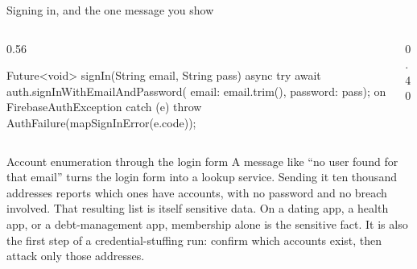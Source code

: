 \documentclass[10pt,aspectratio=169,t]{beamer}
\begin{document}
\begin{frame}[fragile,eyebrow=Firebase Auth]{Signing in, and the one message you show}
  \begin{columns}[T]
    \begin{column}{0.56\textwidth}
\begin{dart}
Future<void> signIn(String email, String pass) async {
  try {
    await auth.signInWithEmailAndPassword(
        email: email.trim(), password: pass);
  } on FirebaseAuthException catch (e) {
    throw AuthFailure(mapSignInError(e.code));
  }
}
\end{dart}
    \end{column}
    \begin{column}{0.40\textwidth}
      \vskip 2mm
    \end{column}
  \end{columns}
\end{frame}

\begin{frame}[eyebrow=Firebase Auth]{Account enumeration through the login form}
  \vskip 3mm
  A message like ``no user found for that email'' turns the login form into a lookup service. Sending it ten thousand addresses reports which ones have accounts, with no password and no breach involved.
  \vskip 3mm
  That resulting list is itself sensitive data. On a dating app, a health app, or a debt-management app, membership alone is the sensitive fact. It is also the first step of a credential-stuffing run: confirm which accounts exist, then attack only those addresses.
\end{frame}
\end{document}

